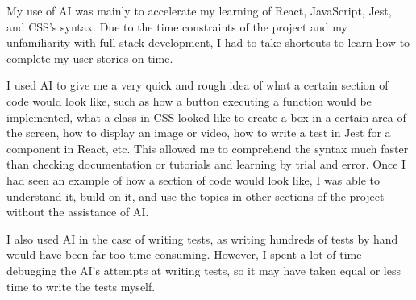 My use of AI was mainly to accelerate my learning of React, JavaScript, Jest, and CSS's syntax. Due to the time constraints of the project and my unfamiliarity with full stack development, I had to take shortcuts to learn how to complete my user stories on time. 

I used AI to give me a very quick and rough idea of what a certain section of code would look like, such as how a button executing a function would be implemented, what a class in CSS looked like to create a box in a certain area of the screen, how to display an image or video, how to write a test in Jest for a component in React, etc. This allowed me to comprehend the syntax much faster than checking documentation or tutorials and learning by trial and error. Once I had seen an example of how a section of code would look like, I was able to understand it, build on it, and use the topics in other sections of the project without the assistance of AI. 

I also used AI in the case of writing tests, as writing hundreds of tests by hand would have been far too time consuming. However, I spent a lot of time debugging the AI's attempts at writing tests, so it may have taken equal or less time to write the tests myself.